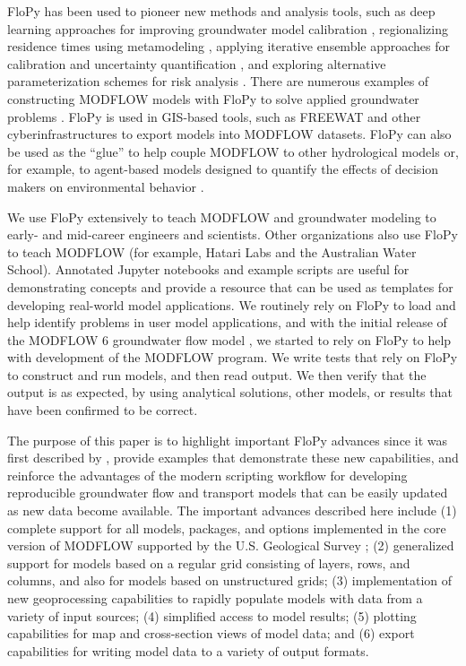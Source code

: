 \documentclass[11pt, oneside]{article}  	%
\begin{document}
FloPy has been used to pioneer new methods and analysis tools, such as deep learning approaches for improving groundwater model calibration \citep{sun2018, zhou2021}, regionalizing residence times using metamodeling \citep{starn2018}, applying iterative ensemble approaches for calibration and uncertainty quantification \citep{white2018ies}, and exploring alternative parameterization schemes for risk analysis \citep{knowling2019}. There are numerous examples of constructing MODFLOW models with FloPy to solve applied groundwater problems \citep{befus2017, vanengelen2018, ebeling2019, zipper2019, befus2020}. FloPy is used in GIS-based tools, such as FREEWAT \citep{freewat2018} and other cyberinfrastructures \citep{essawy2018} to export models into MODFLOW datasets. FloPy can also be used as the ``glue'' to help couple MODFLOW to other hydrological models \citep{burek2020} or, for example, to agent-based models designed to quantify the effects of decision makers on environmental behavior \citep{jaxarozen2019}. 

We use FloPy extensively to teach MODFLOW and groundwater modeling to early- and mid-career engineers and scientists. Other organizations also use FloPy to teach MODFLOW (for example, Hatari Labs and the Australian Water School). Annotated Jupyter notebooks and example scripts are useful for demonstrating concepts and provide a resource that can be used as templates for developing real-world model applications. We routinely rely on FloPy to load and help identify problems in user model applications, and with the initial release of the MODFLOW 6 groundwater flow model \citep{modflow6gwf}, we started to rely on FloPy to help with development of the MODFLOW program. We write tests that rely on FloPy to construct and run models, and then read output. We then verify that the output is as expected, by using analytical solutions, other models, or results that have been confirmed to be correct.

The purpose of this paper is to highlight important FloPy advances since it was first described by \cite{bakker2016scripting}, provide examples that demonstrate these new capabilities, and reinforce the advantages of the modern scripting workflow for developing reproducible groundwater flow and transport models that can be easily updated as new data become available. The important advances described here include (1) complete support for all models, packages, and options implemented in the core version of MODFLOW supported by the U.S. Geological Survey \citep{modflow6framework, modflow6gwf, modflow6xt3d, langevin2020hydraulic, morway2021use, modflow6gwt, modflow6csub, modflow6lkt}; (2) generalized support for models based on a regular grid consisting of layers, rows, and columns, and also for models based on unstructured grids; (3) implementation of new geoprocessing capabilities to rapidly populate models with data from a variety of input sources; (4) simplified access to model results; (5) plotting capabilities for map and cross-section views of model data; and (6) export capabilities for writing model data to a variety of output formats.
\end{document}
